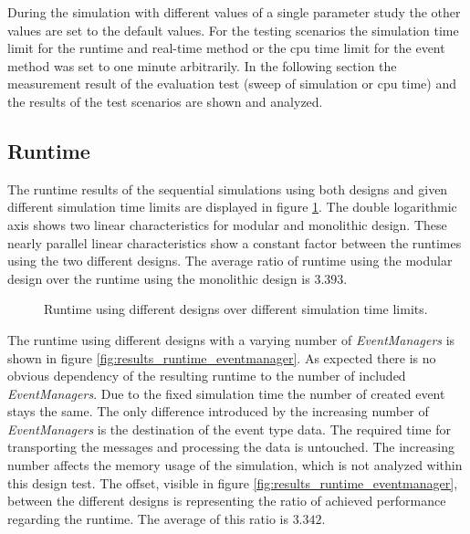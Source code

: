 During the simulation with different values of a single parameter study the other values are set to the default values.
For the testing scenarios the simulation time limit for the runtime and real-time method or the cpu time limit for the event method was set to one minute arbitrarily.
In the following section the measurement result of the evaluation test (sweep of simulation or cpu time) and the results of the test scenarios are shown and analyzed.

\subsection{Runtime}
\label{sec:measurements_sequential_runtime}

The runtime results of the sequential simulations using both designs and given different simulation time limits are displayed in figure \ref{fig:results_runtime_sim_time}.
The double logarithmic axis shows two linear characteristics for modular and monolithic design.
These nearly parallel linear characteristics show a constant factor between the runtimes using the two different designs.
The average ratio of runtime using the modular design over the runtime using the monolithic design is $3.393$.
\\

\begin{figure}
    \centering
    \caption{Runtime using different designs over different simulation time limits.}
    \label{fig:results_runtime_sim_time}
\end{figure}

The runtime using different designs with a varying number of \emph{EventManagers} is shown in figure \ref{fig:results_runtime_eventmanager}.
As expected there is no obvious dependency of the resulting runtime to the number of included \emph{EventManagers}.
Due to the fixed simulation time the number of created event stays the same.
The only difference introduced by the increasing number of \emph{EventManagers} is the destination of the event type data.
The required time for transporting the messages and processing the data is untouched.
The increasing number affects the memory usage of the simulation, which is not analyzed within this design test.
The offset, visible in figure \ref{fig:results_runtime_eventmanager}, between the different designs is representing the ratio of achieved performance regarding the runtime.
The average of this ratio is $3.342$.
\\

